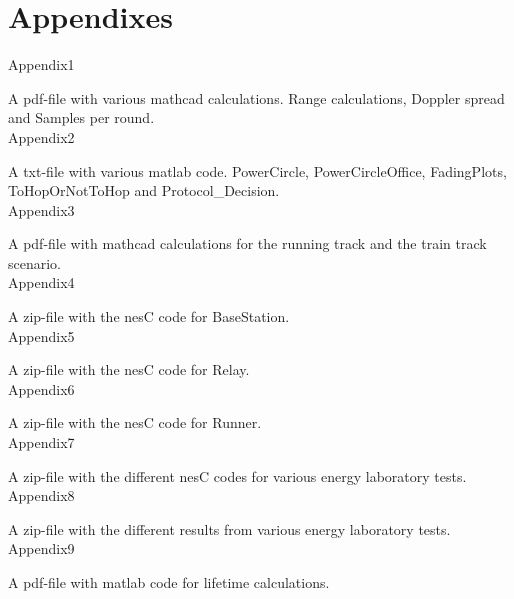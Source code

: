 
 \label{sc:bibliography}

\section*{Appendixes}
\noindent Appendix1

A pdf-file with various mathcad calculations. Range calculations, Doppler spread and Samples per round.\\

\noindent Appendix2

A txt-file with various matlab code. PowerCircle, PowerCircleOffice, FadingPlots, ToHopOrNotToHop and Protocol\_Decision.\\

\noindent Appendix3

A pdf-file with mathcad calculations for the running track and the train track scenario.\\

\noindent Appendix4

A zip-file with the nesC code for BaseStation.\\

\noindent Appendix5

A zip-file with the nesC code for Relay.\\

\noindent Appendix6

A zip-file with the nesC code for Runner.\\

\noindent Appendix7

A zip-file with the different nesC codes for various energy laboratory tests.\\

\noindent Appendix8

A zip-file with the different results from various energy laboratory tests.\\

\noindent Appendix9

A pdf-file with matlab code for lifetime calculations.\\

